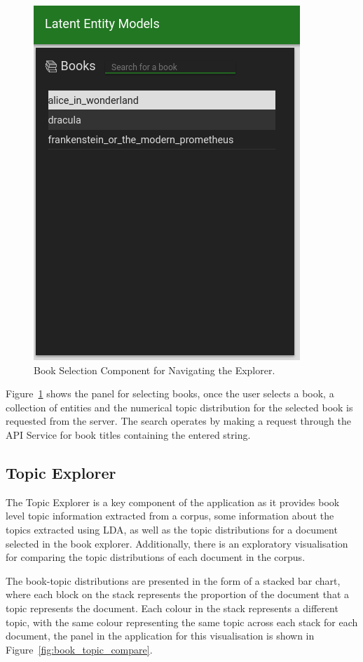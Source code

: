 \documentclass[10pt]{report}
\begin{document}
\begin{figure}[h!]
  \centering
  \includegraphics[scale=0.5]{book_list}
  \caption{Book Selection Component for Navigating the Explorer.\label{fig:book_selection}}
\end{figure}

Figure~\ref{fig:book_selection} shows the panel for selecting books, once the user selects a book, a collection of entities and the numerical topic distribution for the selected book is requested from the server. The search operates by making a request through the API Service for book titles containing the entered string.


\subsection{Topic Explorer}
The Topic Explorer is a key component of the application as it provides book level topic information extracted from a corpus, some information about the topics extracted using LDA, as well as the topic distributions for a document selected in the book explorer. Additionally, there is an exploratory visualisation for comparing the topic distributions of each document in the corpus.

The book-topic distributions are presented in the form of a stacked bar chart, where each block on the stack represents the proportion of the document that a topic represents the document. Each colour in the stack represents a different topic, with the same colour representing the same topic across each stack for each document, the panel in the application for this visualisation is shown in Figure~\ref{fig:book_topic_compare}.
\end{document}
